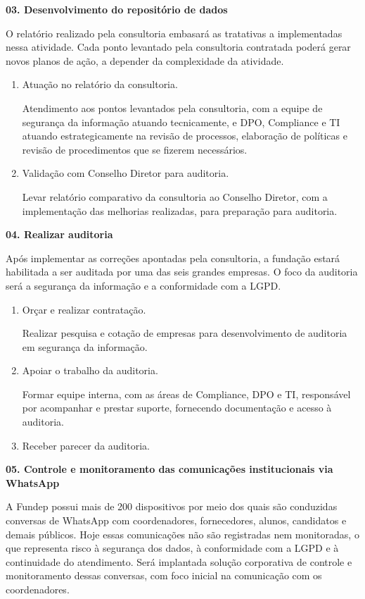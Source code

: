 \documentclass[12pt,a4paper]{article}
\newcommand{\atividade}[1]{%
  \par{\bfseries\color{azulAtividade}#1}\par
}
\begin{document}
\atividade{03. Desenvolvimento do repositório de dados}

O relatório realizado pela consultoria embasará as tratativas a implementadas nessa atividade. Cada ponto levantado pela consultoria contratada poderá gerar novos planos de ação, a depender da complexidade da atividade.

\begin{enumerate}
  \item Atuação no relatório da consultoria.

        Atendimento aos pontos levantados pela consultoria, com a equipe de segurança da informação atuando tecnicamente, e DPO, Compliance e TI atuando estrategicamente na revisão de processos, elaboração de políticas e revisão de procedimentos que se fizerem necessários.
  \item Validação com Conselho Diretor para auditoria.

        Levar relatório comparativo da consultoria ao Conselho Diretor, com a implementação das melhorias realizadas, para preparação para auditoria.
\end{enumerate}

\atividade{04. Realizar auditoria}

Após implementar as correções apontadas pela consultoria, a fundação estará habilitada a ser auditada por uma das seis grandes empresas. O foco da auditoria será a segurança da informação e a conformidade com a LGPD.

\begin{enumerate}
  \item Orçar e realizar contratação.

        Realizar pesquisa e cotação de empresas para desenvolvimento de auditoria em segurança da informação.
  \item Apoiar o trabalho da auditoria.

        Formar equipe interna, com as áreas de Compliance, DPO e TI, responsável por acompanhar e prestar suporte, fornecendo documentação e acesso à auditoria.
  \item Receber parecer da auditoria.
\end{enumerate}

\atividade{05. Controle e monitoramento das comunicações institucionais via WhatsApp}

A Fundep possui mais de 200 dispositivos por meio dos quais são conduzidas conversas de WhatsApp com coordenadores, fornecedores, alunos, candidatos e demais públicos. Hoje essas comunicações não são registradas nem monitoradas, o que representa risco à segurança dos dados, à conformidade com a LGPD e à continuidade do atendimento. Será implantada solução corporativa de controle e monitoramento dessas conversas, com foco inicial na comunicação com os coordenadores.
\end{document}
